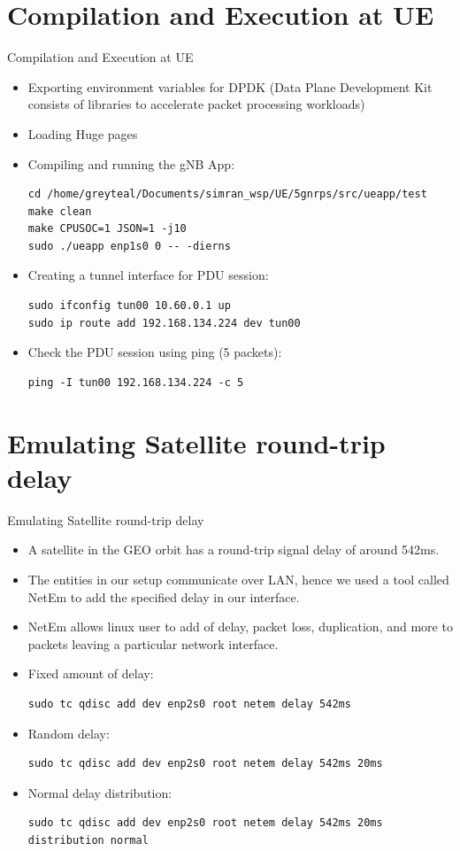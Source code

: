 \documentclass[xcolor=table]{beamer}
\begin{document}
\section{Compilation and Execution at UE}
\begin{frame}[fragile]{Compilation and Execution at UE}
\begin{itemize}
    	\item Exporting environment variables for DPDK (Data Plane Development Kit consists of libraries to accelerate packet processing workloads)
	\item Loading Huge pages
\item Compiling and running the gNB App:
\begin{lstlisting}
cd /home/greyteal/Documents/simran_wsp/UE/5gnrps/src/ueapp/test
make clean
make CPUSOC=1 JSON=1 -j10
sudo ./ueapp enp1s0 0 -- -dierns
\end{lstlisting}
\item Creating a tunnel interface for PDU session:
\begin{lstlisting}
sudo ifconfig tun00 10.60.0.1 up
sudo ip route add 192.168.134.224 dev tun00
\end{lstlisting}
\item Check the PDU session using ping (5 packets):
\begin{lstlisting}
ping -I tun00 192.168.134.224 -c 5
\end{lstlisting}
\end{itemize}
\end{frame}



\section{Emulating Satellite round-trip delay}
\begin{frame}[fragile]{Emulating Satellite round-trip delay}
\begin{itemize}
	\item A satellite in the GEO orbit has a round-trip signal delay of around 542ms.
	\item The entities in our setup communicate over LAN, hence we used a tool called NetEm to add the specified delay in our interface.
	\item NetEm allows linux user to add of delay, packet loss, duplication, and more to packets leaving a particular network interface.
	\item Fixed amount of delay:
	\begin{lstlisting}
sudo tc qdisc add dev enp2s0 root netem delay 542ms
\end{lstlisting}
\item Random delay:
	\begin{lstlisting}
sudo tc qdisc add dev enp2s0 root netem delay 542ms 20ms
\end{lstlisting}
\item Normal delay distribution:
	\begin{lstlisting}
sudo tc qdisc add dev enp2s0 root netem delay 542ms 20ms distribution normal
\end{lstlisting}
\end{itemize}
\end{frame}
\end{document}
